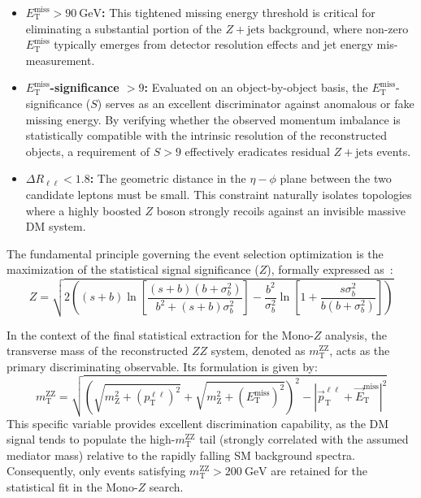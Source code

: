 \begin{itemize}
    \item \textbf{$E_{\text{T}}^{\text{miss}} > 90~\text{GeV}$:} This tightened missing energy threshold is critical for eliminating a substantial portion of the $Z+\text{jets}$ background, where non-zero $E_{\text{T}}^{\text{miss}}$ typically emerges from detector resolution effects and jet energy mis-measurement.
    \item \textbf{$E_{\text{T}}^{\text{miss}}$-significance $> 9$:} Evaluated on an object-by-object basis, the $E_{\text{T}}^{\text{miss}}$-significance ($S$) serves as an excellent discriminator against anomalous or fake missing energy. By verifying whether the observed momentum imbalance is statistically compatible with the intrinsic resolution of the reconstructed objects, a requirement of $S > 9$ effectively eradicates residual $Z+\text{jets}$ events.
    
    \item \textbf{$\Delta R_{\ell\ell} < 1.8$:} The geometric distance in the $\eta-\phi$ plane between the two candidate leptons must be small. This constraint naturally isolates topologies where a highly boosted $Z$ boson strongly recoils against an invisible massive DM system. 
\end{itemize}

The fundamental principle governing the event selection optimization is the maximization of the statistical signal significance ($Z$), formally expressed as~\cite{ATL-PHYS-PUB-2020-025}:
    \begin{equation}
        Z = \sqrt{2\left((s+b)\ln\left[\frac{(s+b)(b+\sigma_{b}^{2})}{b^{2}+(s+b)\sigma_{b}^{2}}\right] - \frac{b^{2}}{\sigma_{b}^{2}}\ln\left[1+\frac{s\sigma_{b}^{2}}{b(b+\sigma_{b}^{2})}\right]\right)}
    \end{equation}

In the context of the final statistical extraction for the Mono-$Z$ analysis, the transverse mass of the reconstructed $ZZ$ system, denoted as $m_{\text{T}}^{\text{ZZ}}$, acts as the primary discriminating observable. Its formulation is given by:
\begin{equation}
    m_{\text{T}}^{\text{ZZ}} = \sqrt{ \left( \sqrt{m_{\text{Z}}^2 + (p_{\text{T}}^{\ell\ell})^2} + \sqrt{m_{\text{Z}}^2 + (E_{\text{T}}^{\text{miss}})^2} \right)^2 - \left| \vec{p}_{\text{T}}^{\ell\ell} + \vec{E}_{\text{T}}^{\text{miss}} \right|^2 }
\end{equation}
This specific variable provides excellent discrimination capability, as the DM signal tends to populate the high-$m_{\text{T}}^{\text{ZZ}}$ tail (strongly correlated with the assumed mediator mass) relative to the rapidly falling SM background spectra. Consequently, only events satisfying $m_{\text{T}}^{\text{ZZ}} > 200~\text{GeV}$ are retained for the statistical fit in the Mono-$Z$ search.

